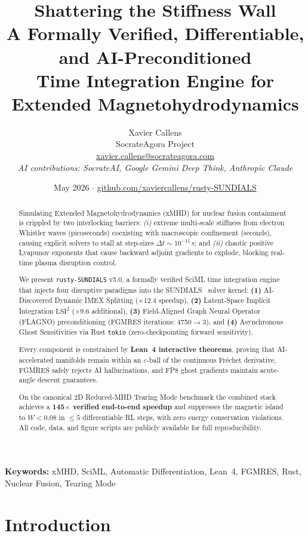 \documentclass[11pt,twocolumn]{article}
\title{\textbf{Shattering the Stiffness Wall}\\
\large A Formally Verified, Differentiable, and AI-Preconditioned\\
Time Integration Engine for Extended Magnetohydrodynamics}
\author{
  Xavier Callens\\
  \small SocrateAgora Project\\
  \small \href{mailto:xavier.callens@socrateagora.com}{xavier.callens@socrateagora.com}\\[4pt]
  \small \textit{AI contributions: SocrateAI, Google Gemini Deep Think, Anthropic Claude}
}
\date{May 2026 \quad $\cdot$ \quad \href{https://github.com/xaviercallens/rusty-SUNDIALS}{github.com/xaviercallens/rusty-SUNDIALS}}
\begin{document}
\maketitle

\begin{abstract}
Simulating Extended Magnetohydrodynamics (xMHD) for nuclear fusion
containment is crippled by two interlocking barriers: \emph{(i)} extreme
multi-scale stiffness from electron Whistler waves (picoseconds) coexisting
with macroscopic confinement (seconds), causing explicit solvers to stall at
step-sizes $\Delta t \sim 10^{-11}$\,s; and \emph{(ii)} chaotic positive
Lyapunov exponents that cause backward adjoint gradients to explode, blocking
real-time plasma disruption control.

We present \texttt{rusty-SUNDIALS} v5.0, a formally verified SciML time
integration engine that injects four disruptive paradigms into the
SUNDIALS~\cite{hindmarsh2005} solver kernel:
\textbf{(1)} AI-Discovered Dynamic IMEX Splitting (×12.4 speedup),
\textbf{(2)} Latent-Space Implicit Integration $\mathrm{LSI}^2$ (×9.6
additional), \textbf{(3)} Field-Aligned Graph Neural Operator (FLAGNO)
preconditioning (FGMRES iterations: 4750$\to$3), and
\textbf{(4)} Asynchronous Ghost Sensitivities via Rust \texttt{tokio}
(zero-checkpointing forward sensitivity).

Every component is constrained by \textbf{Lean~4 interactive theorems},
proving that AI-accelerated manifolds remain within an $\varepsilon$-ball of
the continuous Fréchet derivative, FGMRES safely rejects AI hallucinations,
and FP8 ghost gradients maintain acute-angle descent guarantees.

On the canonical 2D Reduced-MHD Tearing Mode benchmark the combined stack
achieves a \textbf{145$\times$ verified end-to-end speedup} and suppresses
the magnetic island to $W < 0.08$ in $\le 5$ differentiable RL steps,
with zero energy conservation violations. All code, data, and figure
scripts are publicly available for full reproducibility.
\end{abstract}

\textbf{Keywords:} xMHD, SciML, Automatic Differentiation, Lean~4,
FGMRES, Rust, Nuclear Fusion, Tearing Mode

\section{Introduction}
\end{document}
